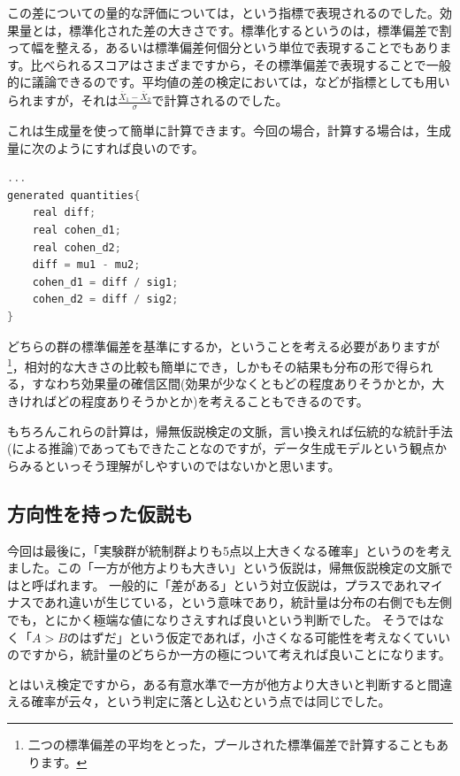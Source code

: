 \documentclass{ltjsbook}
\begin{document}
この差についての量的な評価については，という指標で表現されるのでした。効果量とは，標準化された差の大きさです。標準化するというのは，標準偏差で割って幅を整える，あるいは標準偏差何個分という単位で表現することでもあります。比べられるスコアはさまざまですから，その標準偏差で表現することで一般的に議論できるのです。平均値の差の検定においては，などが指標としても用いられますが，それは$\frac{\bar{X}_1-\bar{X}_2}{\sigma}$で計算されるのでした。

これは生成量を使って簡単に計算できます。今回の場合，計算する場合は，生成量に次のようにすれば良いのです。
\begin{lstlisting}[language=C++,label={code:06_07},caption={生成量ブロックで効果量の算出}]
    ...
generated quantities{
    real diff;
    real cohen_d1;
    real cohen_d2;
    diff = mu1 - mu2;
    cohen_d1 = diff / sig1;
    cohen_d2 = diff / sig2;
}

\end{lstlisting}

どちらの群の標準偏差を基準にするか，ということを考える必要がありますが\footnote{二つの標準偏差の平均をとった，プールされた標準偏差で計算することもあります。}，相対的な大きさの比較も簡単にでき，しかもその結果も分布の形で得られる，すなわち効果量の確信区間(効果が少なくともどの程度ありそうかとか，大きければどの程度ありそうかとか)を考えることもできるのです。

もちろんこれらの計算は，帰無仮説検定の文脈，言い換えれば伝統的な統計手法(による推論)であってもできたことなのですが，データ生成モデルという観点からみるといっそう理解がしやすいのではないかと思います。
\subsection{方向性を持った仮説も}
今回は最後に，「実験群が統制群よりも5点以上大きくなる確率」というのを考えました。この「一方が他方よりも大きい」という仮説は，帰無仮説検定の文脈ではと呼ばれます。
一般的に「差がある」という対立仮説は，プラスであれマイナスであれ違いが生じている，という意味であり，統計量は分布の右側でも左側でも，とにかく極端な値になりさえすれば良いという判断でした。
そうではなく「$A>B$のはずだ」という仮定であれば，小さくなる可能性を考えなくていいのですから，統計量のどちらか一方の極について考えれば良いことになります。

とはいえ検定ですから，ある有意水準で一方が他方より大きいと判断すると間違える確率が云々，という判定に落とし込むという点では同じでした。
\end{document}
